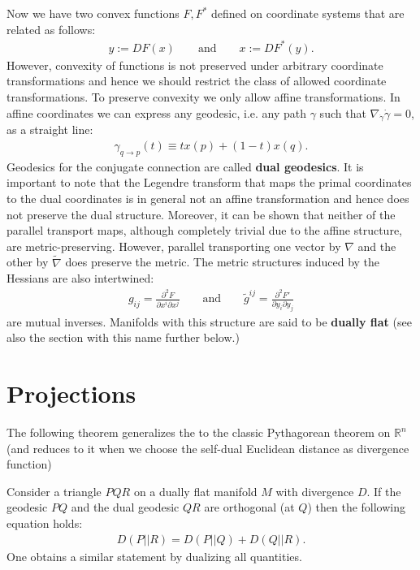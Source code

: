     Now we have two convex functions $F, F^*$ defined on coordinate systems that are related as follows:
    \begin{gather}
        y:=DF(x) \qquad\text{and}\qquad x:=DF^*(y).
    \end{gather}
    However, convexity of functions is not preserved under arbitrary coordinate transformations and hence we should restrict the class of allowed coordinate transformations. To preserve convexity we only allow affine transformations. In affine coordinates we can express any geodesic, i.e. any path $\gamma$ such that $\nabla_{\dot{\gamma}}\dot{\gamma}=0$, as a straight line:
    \begin{gather}
        \gamma_{q\rightarrow p}(t) \equiv tx(p) + (1-t)x(q).
    \end{gather}
    Geodesics for the conjugate connection are called \textbf{dual geodesics}. It is important to note that the Legendre transform that maps the primal coordinates to the dual coordinates is in general not an affine transformation and hence does not preserve the dual structure. Moreover, it can be shown that neither of the parallel transport maps, although completely trivial due to the affine structure, are metric-preserving. However, parallel transporting one vector by $\nabla$ and the other by $\widetilde{\nabla}$ does preserve the metric. The metric structures induced by the Hessians are also intertwined:
    \begin{gather*}
        g_{ij} = \frac{\partial^2F}{\partial x^i\partial x^j}\qquad\text{and}\qquad \widetilde{g}^{ij} = \frac{\partial^2F'}{\partial y_i\partial y_j}
    \end{gather*}
    are mutual inverses. Manifolds with this structure are said to be \textbf{dually flat} (see also the section with this name further below.)

\section{Projections}

    The following theorem generalizes the to the classic Pythagorean theorem on $\mathbb{R}^n$ (and reduces to it when we choose the self-dual Euclidean distance as divergence function)
    \begin{theorem}[Pythagoras]
        Consider a triangle $PQR$ on a dually flat manifold $M$ with divergence $D$. If the geodesic $PQ$ and the dual geodesic $QR$ are orthogonal (at $Q$) then the following equation holds:
        \begin{gather}
            D(P||R) = D(P||Q) + D(Q||R).
        \end{gather}
        One obtains a similar statement by dualizing all quantities.
    \end{theorem}

